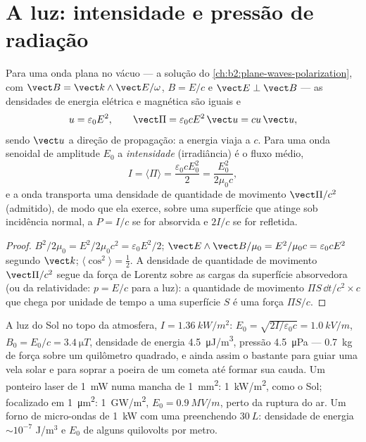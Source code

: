 \section{A luz: intensidade e pressão de radiação}

\begin{proposition}\label{prop:b2:poynting-vector:wave}
Para uma onda plana no vácuo --- a solução do \cref{ch:b2:plane-waves-polarization},
com $\vect B = \vect k\wedge\vect E/\omega$, $B = E/c$ e $\vect E \perp \vect B$ ---
as densidades de energia elétrica e magnética são iguais e
\[
u = \varepsilon_0E^2 , \qquad \vect\Pi = \varepsilon_0cE^2\,\vect u = cu\,\vect u ,
\]
sendo $\vect u$ a direção de propagação: a energia viaja a $c$.
Para uma onda senoidal de amplitude $E_0$ a \emph{intensidade}
(irradiância) é o fluxo médio,
\[
I = \langle\Pi\rangle = \frac{\varepsilon_0cE_0^2}2 = \frac{E_0^2}{2\mu_0c} ,
\]
e a onda transporta uma densidade de quantidade de movimento $\vect\Pi/c^2$ (admitido), de modo
que ela exerce, sobre uma superfície que atinge sob incidência normal, a
\emph{} $P = I/c$ se for absorvida e $2I/c$ se for refletida.
\end{proposition}

\begin{proof}
$B^2/2\mu_0 = E^2/2\mu_0c^2 = \varepsilon_0E^2/2$; $\vect E\wedge\vect B/\mu_0 = E^2/\mu_0c =
\varepsilon_0cE^2$ segundo $\vect k$; $\langle\cos^2\rangle = \tfrac12$. A densidade de
quantidade de movimento $\vect\Pi/c^2$ segue da força de Lorentz sobre as cargas da
superfície absorvedora (ou da relatividade: $p = E/c$ para a luz): a
quantidade de movimento $\Pi S\,\dd t/c^2\times c$ que chega por unidade de tempo a uma superfície $S$ é
uma força $\Pi S/c$.
\end{proof}

\begin{example}\label{ex:b2:poynting-vector:orders}
A luz do Sol no topo da atmosfera, $I = \qty{1.36}{kW/m^2}$: $E_0 =
\sqrt{2I/\varepsilon_0c} = \qty{1.0}{kV/m}$, $B_0 = E_0/c = \qty{3.4}{\micro T}$, densidade
de energia \qty{4.5}{\micro J/m^3}, pressão \qty{4.5}{\micro Pa} --- \qty{0.7}{kg}
de força sobre um quilômetro quadrado, e ainda assim o bastante para guiar uma vela solar e para
soprar a poeira de um cometa até formar sua cauda. Um ponteiro laser de \qty{1}{mW} numa
mancha de \qty{1}{mm^2}: \qty{1}{kW/m^2}, como o Sol; focalizado em \qty{1}{\micro m^2}:
\qty{1}{GW/m^2}, $E_0 = \qty{0.9}{MV/m}$, perto da ruptura do ar. Um
forno de micro-ondas de \qty{1}{kW} com uma  preenchendo $\qty{30}{L}$: densidade
de energia $\sim 10^{-7}$ J/m$^3$ e $E_0$ de alguns quilovolts por metro.
\end{example}

